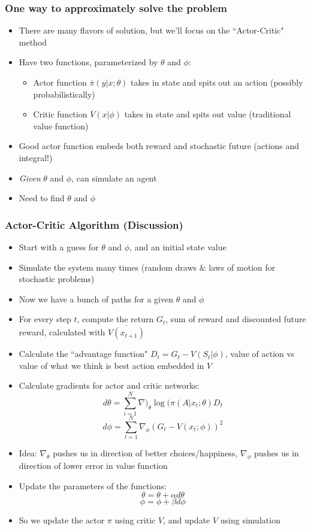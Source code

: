 \documentclass{beamer}
\begin{document}
\begin{frame}
\frametitle[alignment=center]{One way to approximately solve the problem}
\begin{itemize}
\item There are many flavors of solution, but we'll focus on the ``Actor-Critic" method
\bigskip
\item Have two functions, parameterized by $\theta$ and $\phi$:
\begin{itemize}
\item Actor function $\overline{\pi}(y|x;\theta)$ takes in state and spits out an action (possibly probabilistically)
\bigskip
\item Critic function $\overline{V}(x|\phi)$  takes in state and spits out value (traditional value function)
\end{itemize}
\bigskip
\item Good actor function embeds both reward and stochastic future (actions and integral!)
\bigskip
\item \emph{Given} $\theta$ and $\phi$, can simulate an agent
\bigskip
\item Need to find $\theta$ and $\phi$
\end{itemize}
\end{frame}


\begin{frame}
\frametitle[alignment=center]{Actor-Critic Algorithm (Discussion)}
\begin{itemize}
\footnotesize
\item Start with a guess for $\theta$ and $\phi$, and an initial state value
\item Simulate the system many times (random draws \& laws of motion for stochastic problems)
\item Now we have a bunch of paths for a given $\theta$ and $\phi$
\item For every step $t$, compute the return $G_t$, sum of reward and discounted future reward, calculated with $\overline{V(x_{t+1})}$
\item Calculate the ``advantage function" $D_t=G_t-V(S_t|\phi)$, value of action vs value of what we think is best action embedded in $V$
\item Calculate gradients for actor and critic networks: 
$$d\theta=\sum_{i=1}^N\nabla)_{\theta}\log(\pi(A|x_t;\theta)D_t$$
$$d\phi=\sum_{t=1}^N\nabla_{\phi}(G_t-V(x_t;\phi))^2$$
\item Idea:  $\nabla_{\theta}$ pushes us in direction of better choices/happiness, $\nabla_{\phi}$ pushes us in direction of lower error in value function
\item Update the parameters of the functions:
$$\theta=\theta+\alpha d\theta$$
$$\phi=\phi+\beta d\phi$$
\item So we update the actor $\pi$ using critic $V$, and update $V$ using simulation
\end{itemize}
\end{frame}
\end{document}
